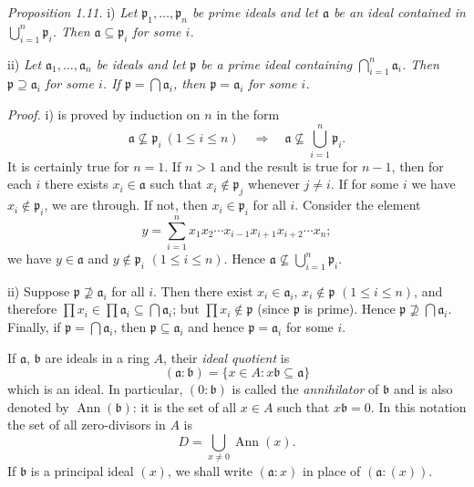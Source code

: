 
\noindent\textit{Proposition 1.11.} i) \textit{Let $\mathfrak p_1,\ldots,\mathfrak p_n$ be prime ideals and let $\mathfrak a$ be an ideal contained in $\bigcup_{i=1}^n\mathfrak p_i$. Then $\mathfrak a\subseteq\mathfrak p_i$ for some $i$.}

ii) \textit{Let $\mathfrak a_1,\ldots,\mathfrak a_n$ be ideals and let $\mathfrak p$ be a prime ideal containing $\bigcap_{i=1}^n\mathfrak a_i$. Then $\mathfrak p\supseteq\mathfrak a_i$ for some $i$. If $\mathfrak p=\bigcap\mathfrak a_i$, then $\mathfrak p=\mathfrak a_i$ for some $i$.}

\noindent\textit{Proof.} i) is proved by induction on $n$ in the form
\[
 \mathfrak a\nsubseteq\mathfrak p_i\ (1\leq i\leq n)
 \quad\Rightarrow\quad
 \mathfrak a\nsubseteq\bigcup_{i=1}^n\mathfrak p_i.
\]
It is certainly true for $n=1$. If $n>1$ and the result is true for $n-1$, then for each $i$ there exists $x_i\in\mathfrak a$ such that $x_i\notin\mathfrak p_j$ whenever $j\neq i$. If for some $i$ we have $x_i\notin\mathfrak p_i$, we are through. If not, then $x_i\in\mathfrak p_i$ for all $i$. Consider the element
\[
 y=\sum_{i=1}^n x_1x_2\cdots x_{i-1}x_{i+1}x_{i+2}\cdots x_n;
\]
we have $y\in\mathfrak a$ and $y\notin\mathfrak p_i$ $(1\leq i\leq n)$. Hence $\mathfrak a\nsubseteq\bigcup_{i=1}^n\mathfrak p_i$.

ii) Suppose $\mathfrak p\nsupseteq\mathfrak a_i$ for all $i$. Then there exist $x_i\in\mathfrak a_i$, $x_i\notin\mathfrak p$ $(1\leq i\leq n)$, and therefore $\prod x_i\in\prod\mathfrak a_i\subseteq\bigcap\mathfrak a_i$; but $\prod x_i\notin\mathfrak p$ (since $\mathfrak p$ is prime). Hence $\mathfrak p\nsupseteq\bigcap\mathfrak a_i$. Finally, if $\mathfrak p=\bigcap\mathfrak a_i$, then $\mathfrak p\subseteq\mathfrak a_i$ and hence $\mathfrak p=\mathfrak a_i$ for some $i$. \proofbox

If $\mathfrak a$, $\mathfrak b$ are ideals in a ring $A$, their \textit{ideal quotient} is
\[
 (\mathfrak a:\mathfrak b)=\{x\in A:x\mathfrak b\subseteq\mathfrak a\}
\]
which is an ideal. In particular, $(0:\mathfrak b)$ is called the \textit{annihilator} of $\mathfrak b$ and is also denoted by $\operatorname{Ann}(\mathfrak b)$: it is the set of all $x\in A$ such that $x\mathfrak b=0$. In this notation the set of all zero-divisors in $A$ is
\[
 D=\bigcup_{x\neq0}\operatorname{Ann}(x).
\]
If $\mathfrak b$ is a principal ideal $(x)$, we shall write $(\mathfrak a:x)$ in place of $(\mathfrak a:(x))$.

